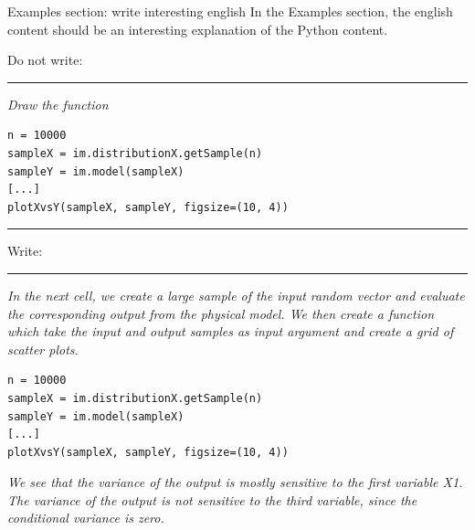 \documentclass[8pt, handout]{beamer}
\begin{document}
\begin{frame}[fragile]{Examples section: write interesting english}
In the Examples section, the english content should be an interesting explanation 
of the Python content. 

Do not write:
\par\noindent\rule{\textwidth}{0.4pt}
\textit{
Draw the function
}

\begin{lstlisting}
n = 10000
sampleX = im.distributionX.getSample(n)
sampleY = im.model(sampleX)
[...]
plotXvsY(sampleX, sampleY, figsize=(10, 4))
\end{lstlisting}
\par\noindent\rule{\textwidth}{0.4pt}
Write:
\par\noindent\rule{\textwidth}{0.4pt}
\textit{
In the next cell, we create a large sample of the input random vector 
and evaluate the corresponding output from the physical model. 
We then create a function which take 
the input and output samples as input argument and create a grid 
of scatter plots. 
}

\begin{lstlisting}
n = 10000
sampleX = im.distributionX.getSample(n)
sampleY = im.model(sampleX)
[...]
plotXvsY(sampleX, sampleY, figsize=(10, 4))
\end{lstlisting}

\textit{
We see that the variance of the output is mostly sensitive to the first variable X1. 
The variance of the output is not sensitive to the third 
variable, since the conditional variance is zero. 
}


\end{frame}
\end{document}
